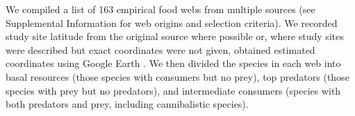 \documentclass[12pt]{article}
\begin{document}
  We compiled a list of 163 empirical food webs from
  multiple sources (see Supplemental Information for web origins and selection
  criteria). We recorded study site latitude from the original source where
  possible or, where study sites were described but exact coordinates were not
  given, obtained estimated coordinates using Google Earth \citep{GoogleEarth}.
  We then divided the species in each web into basal resources (those species with
  consumers but no prey), top predators (those species with prey but no predators),
  and intermediate consumers (species with both predators and prey, including cannibalistic
  species). 

\end{document}
